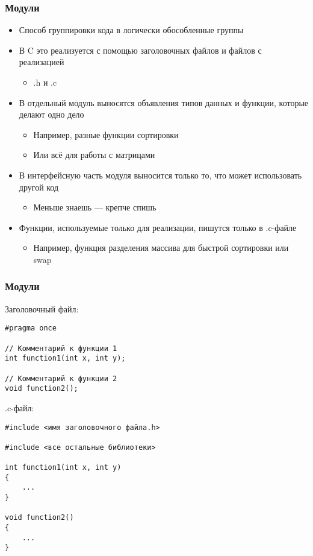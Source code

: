 \documentclass{../../slides-style}
\begin{document}
    \begin{frame}[fragile]
        \frametitle{Модули}
        \begin{itemize}
            \item Способ группировки кода в логически обособленные группы
            \item В C это реализуется с помощью заголовочных файлов и файлов с реализацией
            \begin{itemize}
                \item .h и .c
            \end{itemize}
            \item В отдельный модуль выносятся объявления типов данных и функции, которые делают одно дело
            \begin{itemize}
                \item Например, разные функции сортировки
                \item Или всё для работы с матрицами
            \end{itemize}
            \item В интерфейсную часть модуля выносится только то, что может использовать другой код
            \begin{itemize}
                \item Меньше знаешь --- крепче спишь
            \end{itemize}
            \item Функции, используемые только для реализации, пишутся только в .c-файле
            \begin{itemize}
                \item Например, функция разделения массива для быстрой сортировки или swap
            \end{itemize}
        \end{itemize}
    \end{frame}

    \begin{frame}[fragile]
        \frametitle{Модули}
        \begin{scriptsize}
            Заголовочный файл:
            \begin{verbatim}
#pragma once

// Комментарий к функции 1
int function1(int x, int y);

// Комментарий к функции 2
void function2();
            \end{verbatim}
            .c-файл:
            \begin{verbatim}
#include <имя заголовочного файла.h>

#include <все остальные библиотеки>

int function1(int x, int y)
{
    ...
}

void function2()
{
    ...
}
            \end{verbatim}
        \end{scriptsize}
    \end{frame}
\end{document}
